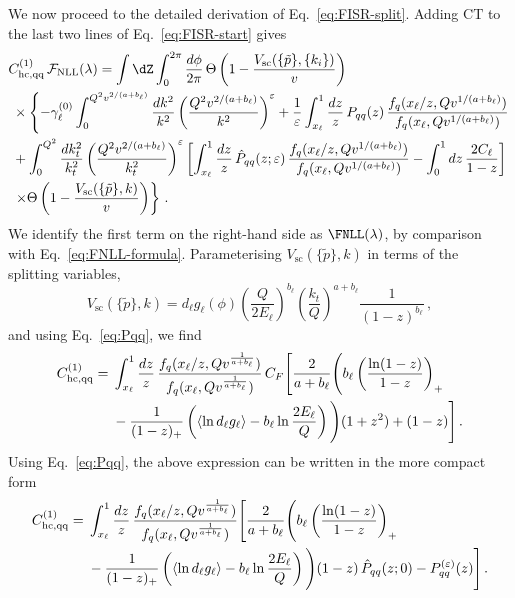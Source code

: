 We now proceed to the detailed derivation of Eq.~\eqref{eq:FISR-split}. 
Adding $\mathrm{CT}$ to the last two lines of
Eq.~\eqref{eq:FISR-start} gives
\begin{align}
&C^{(1)}_{\rm hc,qq}\, \mathcal{F}_{\rm NLL}(\lambda)= \int \dZ \int_0^{2\pi}\frac{d\phi}{2\pi}\,\Theta\left(1-\frac{V_{\mathrm{sc}}(\{\tilde{p}\},\{k_i\})}{v}\right)\nonumber\\
&\;\times\left\{ -\gamma_\ell^{(0)}\int_0^{Q^2v^{2/(a+b_\ell)}}\frac{dk^2}{k^2}\left(\frac{Q^2v^{2/(a+b_\ell)}}{k^2}\right)^{\varepsilon}+\frac{1}{\varepsilon} \int_{x_\ell}^1 \frac{dz}{z}\, P_{qq}(z)\, \frac{f_q(x_\ell/z,Q v^{1/(a+b_\ell)})}{f_q(x_\ell,Q v^{1/(a+b_\ell)})} \right.\nonumber\\
&\;+\int_0^{Q^2}\frac{dk_t^2}{k_t^2}\left(\frac{Q^2v^{2/(a+b_\ell)}}{k_t^2}\right)^{\varepsilon} \left[\int_{x_\ell}^1\frac{dz}{z}\, \hat P_{qq}(z;\varepsilon)\,\frac{f_q(x_\ell/z,Qv^{1/(a+b_\ell)})}{f_q(x_\ell,Qv^{1/(a+b_\ell)})}-\int_0^1dz\,\frac{2 C_\ell}{1-z}\right]\nonumber\\
&\;\left.\times\Theta\left(1-\frac{V_{\mathrm{sc}}(\{\tilde{p}\},k)}{v}\right)\right\}\,.
\end{align}
We identify the first term on the right-hand side as $\FNLL(\lambda)$, by
comparison with Eq.~\eqref{eq:FNLL-formula}. 
Parameterising  $V_{\mathrm{sc}}(\{\tilde{p}\},k)$ in terms of the splitting variables,
\begin{equation}
\label{eq:Vsc-param}
V_{\mathrm{sc}}(\{\tilde{p}\},k)=d_\ell g_\ell(\phi) \left(\frac{Q}{2 E_\ell}\right)^{b_\ell}\left(\frac{k_t}{Q}\right)^{a+b_\ell}\frac{1}{(1-z)^{b_\ell}}\,,
\end{equation}
and using Eq.~\eqref{eq:Pqq}, we find
\begin{align}
C^{(1)}_{\rm hc, qq}={}&  \int_{x_\ell}^1\frac{dz}{z}\,\frac{f_q(x_\ell/z,Qv^{\frac{1}{a+b_\ell}})}{f_q(x_\ell,Qv^{\frac{1}{a+b_\ell}})}\,
C_F\Bigg[\frac{2 }{a+b_\ell}\Bigg(b_\ell\left(\frac{\ln(1-z)}{1-z}\right)_+\nonumber\\
&-\frac{1}{(1-z)_+}\left(\langle\ln d_\ell g_\ell\rangle-b_\ell \ln\frac{2E_\ell}{Q}\right)\Bigg)(1+z^2)+(1-z)\Bigg]\,. \label{eq:C1qq-alm-final}
\end{align}
Using Eq.~\eqref{eq:Pqq}, the above expression can be written in the more compact form
  \begin{align}
C^{(1)}_{\rm hc, qq}={}&  \int_{x_\ell}^1\frac{dz}{z}\,\frac{f_q(x_\ell/z,Qv^{\frac{1}{a+b_\ell}})}{f_q(x_\ell,Qv^{\frac{1}{a+b_\ell}})}
\Bigg[\frac{2 }{a+b_\ell}\Bigg(b_\ell\left(\frac{\ln(1-z)}{1-z}\right)_+\nonumber\\
&-\frac{1}{(1-z)_+}\left(\langle\ln d_\ell g_\ell\rangle-b_\ell \ln\frac{2E_\ell}{Q}\right)\Bigg)(1-z)\,\hat P_{qq}(z;0)-P_{qq}^{(\varepsilon)}(z)\Bigg]\,. \label{eq:C1qq-final}
\end{align}


